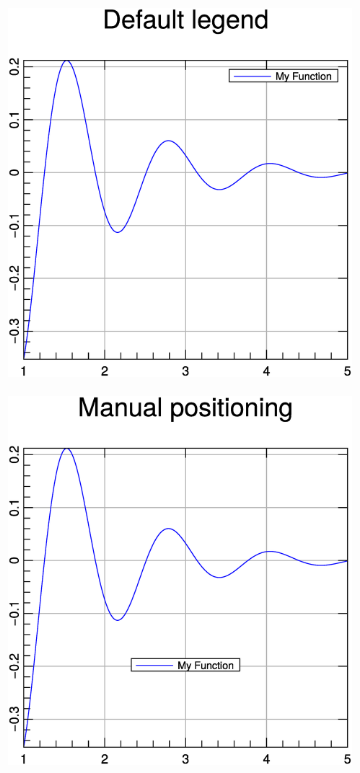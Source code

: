 \documentclass[a4paper]{article}
\begin{document}
\begin{figure}[h]
  \centering
  \begin{subfigure}[hb]{.32\linewidth}
    \includegraphics[width=\textwidth]{./examples_from_doc/legend/legend_1.eps}
  \end{subfigure}
  \hspace{2cm}
  \begin{subfigure}[hb]{.32\linewidth}
    \includegraphics[width=\textwidth]{./examples_from_doc/legend/legend_2.eps}
  \end{subfigure}
\end{figure}
\end{document}
